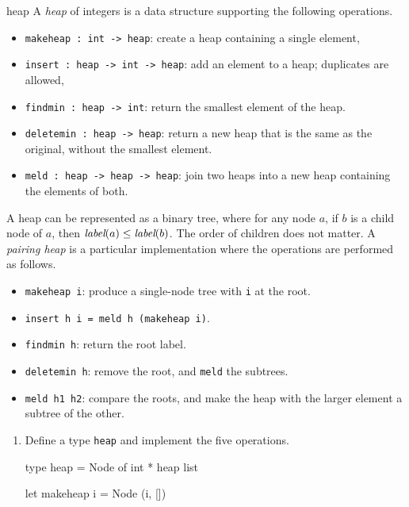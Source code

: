 %
\begin{exercise}{heap}
A \emph{heap} of integers is a data structure supporting the following operations.

\begin{itemize}
\item \lstinline!makeheap : int -> heap!: create a heap containing a single element,
\item \lstinline!insert : heap -> int -> heap!: add an element to a heap; duplicates are allowed,
\item \lstinline!findmin : heap -> int!: return the smallest element of the heap.
\item \lstinline!deletemin : heap -> heap!: return a new heap that is the same as the original, without the smallest element.
\item \lstinline!meld : heap -> heap -> heap!: join two heaps into a new heap containing the elements of both.
\end{itemize}
%
A heap can be represented as a binary tree, where for any node $a$, if $b$ is a child node of $a$,
then $\textit{label}(a) \le \textit{label}(b)$.  The order of children does not matter.  A \emph{pairing heap} is a
particular implementation where the operations are performed as follows.

\begin{itemize}
\item \lstinline!makeheap i!: produce a single-node tree with \hbox{\lstinline/i/} at the root.
\item \lstinline!insert h i = meld h (makeheap i)!.
\item \lstinline!findmin h!: return the root label.
\item \lstinline!deletemin h!: remove the root, and \hbox{\lstinline/meld/} the subtrees.
\item \lstinline!meld h1 h2!: compare the roots, and make the heap with the larger element a subtree of the other.
\end{itemize}
%
\begin{enumerate}
\item
Define a type \hbox{\lstinline/heap/} and implement the five operations.

\begin{answer}\ifanswers
\begin{ocaml}
type heap = Node of int * heap list

let makeheap i = Node (i, [])


\end{ocaml}
\end{answer}
\end{enumerate}
\end{exercise}
